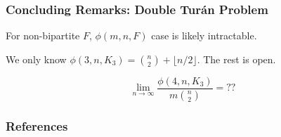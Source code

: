 \documentclass{beamer}
\begin{document}
\begin{frame}
  \frametitle{Concluding Remarks: Double Turán Problem}

  For non-bipartite $F$, $\phi(m, n, F)$ case is likely intractable.

  \pause

  \vspace{0.5cm}

  We only know $\phi(3, n, K_3) = \binom{n}{2} + \lfloor n/2\rfloor$. The rest is open.

  \pause

  \vspace{0.2cm}

  \[
    \lim_{n \to \infty} \frac{\phi(4, n, K_3)}{m\binom{n}{2}} = ??
  \]
\end{frame}

\begin{frame}[allowframebreaks] 
  \frametitle{References}
  \printbibliography
\end{frame}
\end{document}
